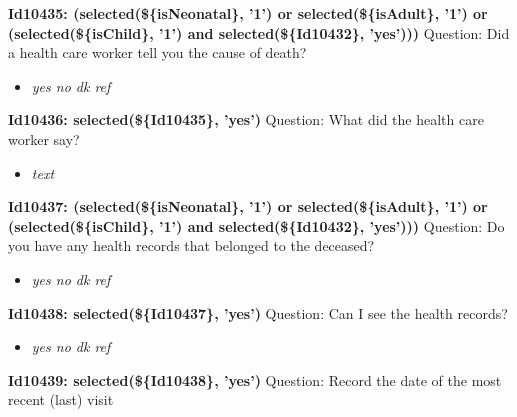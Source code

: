 \documentclass{article}%
\begin{document}
\textbf{Id10435: (selected(\$\{isNeonatal\}, '1') or selected(\$\{isAdult\}, '1') or (selected(\$\{isChild\}, '1') and selected(\$\{Id10432\}, 'yes')))\newline%
}%
Question: Did a health care worker tell you the cause of death?\newline%
%
\begin{itemize}%
\item%
\textit{yes\newline%
 no\newline%
 dk\newline%
 ref\newline%
}%
\end{itemize}%
\textbf{Id10436: selected(\$\{Id10435\}, 'yes')\newline%
}%
Question: What did the health care worker say?\newline%
%
\begin{itemize}%
\item%
\textit{text\newline%
}%
\end{itemize}%
\textbf{Id10437: (selected(\$\{isNeonatal\}, '1') or selected(\$\{isAdult\}, '1') or (selected(\$\{isChild\}, '1') and selected(\$\{Id10432\}, 'yes')))\newline%
}%
Question: Do you have any health records that belonged to the deceased?\newline%
%
\begin{itemize}%
\item%
\textit{yes\newline%
 no\newline%
 dk\newline%
 ref\newline%
}%
\end{itemize}%
\textbf{Id10438: selected(\$\{Id10437\}, 'yes')\newline%
}%
Question: Can I see the health records?\newline%
%
\begin{itemize}%
\item%
\textit{yes\newline%
 no\newline%
 dk\newline%
 ref\newline%
}%
\end{itemize}%
\textbf{Id10439: selected(\$\{Id10438\}, 'yes')\newline%
}%
Question: Record the date of the most recent (last) visit\newline%
\end{document}
